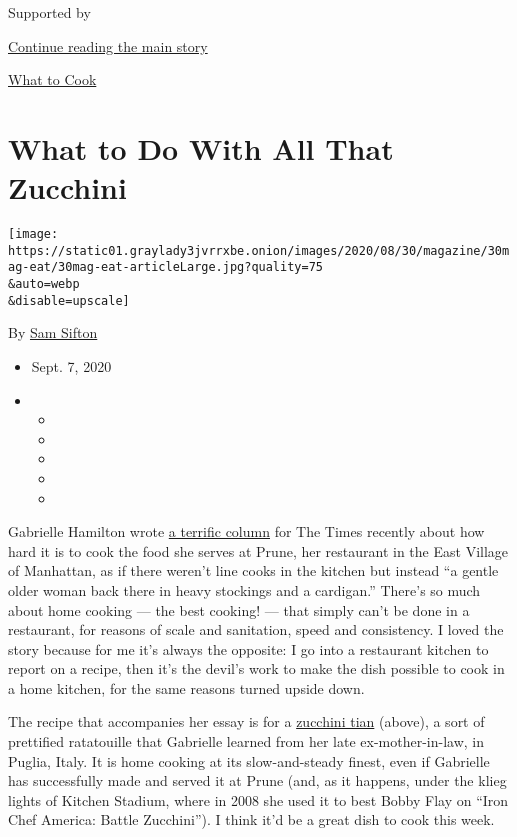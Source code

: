 Supported by

\protect\hyperlink{after-sponsor}{Continue reading the main story}

\href{/column/what-to-cook}{What to Cook}

\hypertarget{what-to-do-with-all-that-zucchini}{%
\section{What to Do With All That
Zucchini}\label{what-to-do-with-all-that-zucchini}}

\texttt{[image: https://static01.graylady3jvrrxbe.onion/images/2020/08/30/magazine/30mag-eat/30mag-eat-articleLarge.jpg?quality=75\\\&auto=webp\\\&disable=upscale]}

By \href{https://www.nytimes3xbfgragh.onion/by/sam-sifton}{Sam Sifton}

\begin{itemize}
\item
  Sept. 7, 2020
\item
  \begin{itemize}
  \item
  \item
  \item
  \item
  \item
  \end{itemize}
\end{itemize}

Gabrielle Hamilton wrote
\href{https://www.nytimes3xbfgragh.onion/2020/08/26/magazine/this-zucchini-tian-is-nonna-inspired-cooking-at-restaurant-speed.html}{a
terrific column} for The Times recently about how hard it is to cook the
food she serves at Prune, her restaurant in the East Village of
Manhattan, as if there weren't line cooks in the kitchen but instead ``a
gentle older woman back there in heavy stockings and a cardigan.''
There's so much about home cooking --- the best cooking! --- that simply
can't be done in a restaurant, for reasons of scale and sanitation,
speed and consistency. I loved the story because for me it's always the
opposite: I go into a restaurant kitchen to report on a recipe, then
it's the devil's work to make the dish possible to cook in a home
kitchen, for the same reasons turned upside down.

The recipe that accompanies her essay is for a
\href{https://cooking.nytimes3xbfgragh.onion/recipes/1021395-tian}{zucchini
tian} (above), a sort of prettified ratatouille that Gabrielle learned
from her late ex-mother-in-law, in Puglia, Italy. It is home cooking at
its slow-and-steady finest, even if Gabrielle has successfully made and
served it at Prune (and, as it happens, under the klieg lights of
Kitchen Stadium, where in 2008 she used it to best Bobby Flay on ``Iron
Chef America: Battle Zucchini''). I think it'd be a great dish to cook
this week.

